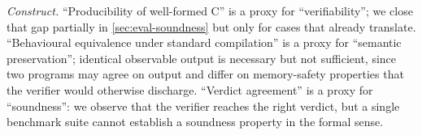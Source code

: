 \textit{Construct.} ``Producibility of well-formed C'' is a proxy for ``verifiability''; we close that gap partially in \autoref{sec:eval-soundness} but only for cases that already translate. %
``Behavioural equivalence under standard compilation'' is a proxy for ``semantic preservation''; identical observable output is necessary but not sufficient, since two programs may agree on output and differ on memory-safety properties that the verifier would otherwise discharge. %
``Verdict agreement'' is a proxy for ``soundness'': we observe that the verifier reaches the right verdict, but a single benchmark suite cannot establish a soundness property in the formal sense. %
